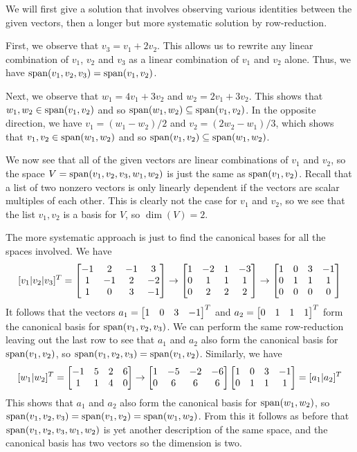 \documentclass[a4paper]{amsart}
\renewenvironment{solution}{\SolutionInline}{\endSolutionInline}
\begin{document}
\begin{solution}
 We will first give a solution that involves observing various
 identities between the given vectors, then a longer but more
 systematic solution by row-reduction.

 First, we observe that $v_3=v_1+2v_2$.  This allows us to rewrite any
 linear combination of $v_1$, $v_2$ and $v_3$ as a linear combination
 of $v_1$ and $v_2$ alone.  Thus, we have
 $\operatorname{span}(v_1,v_2,v_3)=\operatorname{span}(v_1,v_2)$.  

 Next, we observe that $w_1=4v_1+3v_2$ and $w_2=2v_1+3v_2$.  This
 shows that $w_1,w_2\in\operatorname{span}(v_1,v_2)$ and so
 $\operatorname{span}(w_1,w_2)\subseteq\operatorname{span}(v_1,v_2)$.  In the opposite direction, we have 
 $v_1=(w_1-w_2)/2$ and $v_2=(2w_2-w_1)/3$, which shows that
 $v_1,v_2\in\operatorname{span}(w_1,w_2)$ and so $\operatorname{span}(v_1,v_2)\subseteq\operatorname{span}(w_1,w_2)$.

 We now see that all of the given vectors are linear combinations of
 $v_1$ and $v_2$, so the space $V=\operatorname{span}(v_1,v_2,v_3,w_1,w_2)$ is just
 the same as $\operatorname{span}(v_1,v_2)$.  Recall that a list of two nonzero
 vectors is only linearly dependent if the vectors are scalar
 multiples of each other.  This is clearly not the case for $v_1$ and
 $v_2$, so we see that the list $v_1,v_2$ is a basis for $V$, so
 $\dim(V)=2$.  

 The more systematic approach is just to find the canonical bases for
 all the spaces involved.  We have
 \[ 
  [v_1|v_2|v_3]^T 
  = 
  \left[\begin{matrix} 
   -1 &  2 & -1 &  3 \\
    1 & -1 &  2 & -2 \\
    1 &  0 &  3 & -1 
  \end{matrix}\right]
  \to 
  \left[\begin{matrix} 
    1 & -2 &  1 & -3 \\
    0 &  1 &  1 &  1 \\
    0 &  2 &  2 &  2 
  \end{matrix}\right]
  \to
  \left[\begin{matrix} 
    1 &  0 &  3 & -1 \\
    0 &  1 &  1 &  1 \\
    0 &  0 &  0 &  0 
  \end{matrix}\right]
 \]
 It follows that the vectors $a_1=\left[\begin{matrix} 1&0&3&-1\end{matrix}\right]^T$ and
 $a_2=\left[\begin{matrix} 0&1&1&1\end{matrix}\right]^T$ form the canonical basis for
 $\operatorname{span}(v_1,v_2,v_3)$.  We can perform the same row-reduction leaving
 out the last row to see that $a_1$ and $a_2$ also form the canonical
 basis for $\operatorname{span}(v_1,v_2)$, so $\operatorname{span}(v_1,v_2,v_3)=\operatorname{span}(v_1,v_2)$.
 Similarly, we have
 \[ [w_1|w_2]^T =
     \left[\begin{matrix}
      -1 &  5 &  2 &  6 \\
       1 &  1 &  4 &  0 
     \end{matrix}\right] 
     \to
     \left[\begin{matrix}
       1 & -5 & -2 & -6 \\
       0 &  6 &  6 &  6 
     \end{matrix}\right] 
     \left[\begin{matrix}
       1 &  0 &  3 & -1 \\
       0 &  1 &  1 &  1 
     \end{matrix}\right] 
     =
     [a_1|a_2]^T
 \]
 This shows that $a_1$ and $a_2$ also form the canonical
 basis for $\operatorname{span}(w_1,w_2)$, so
 $\operatorname{span}(v_1,v_2,v_3)=\operatorname{span}(v_1,v_2)=\operatorname{span}(w_1,w_2)$.  From this it
 follows as before that $\operatorname{span}(v_1,v_2,v_3,w_1,w_2)$ is yet another
 description of the same space, and the canonical basis has two
 vectors so the dimension is two.
\end{solution}
\end{document}
